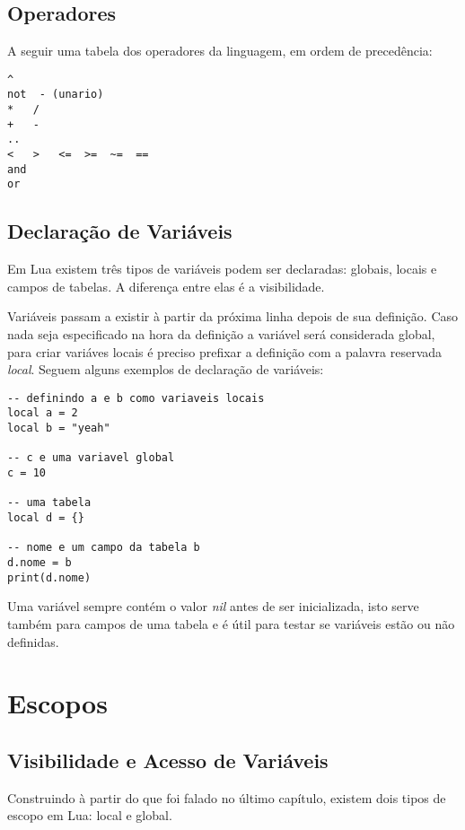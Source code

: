 \documentclass[a4paper,12pt]{abnt}
\begin{document}
\section{Operadores}

A seguir uma tabela dos operadores da linguagem, em ordem de precedência:

\begin{lstlisting}
^
not  - (unario)
*   /
+   -
..
<   >   <=  >=  ~=  ==
and
or
\end{lstlisting}

\section{Declaração de Variáveis}

Em Lua existem três tipos de variáveis podem ser declaradas:
globais, locais e campos de tabelas. A diferença entre
elas é a visibilidade.

Variáveis passam a existir à partir da próxima linha depois de sua definição.
Caso nada seja especificado na hora da definição
a variável será considerada global,
para criar variáves locais é preciso prefixar a definição
com a palavra reservada \emph{local}.
Seguem alguns exemplos de declaração de variáveis:

\begin{lstlisting}
-- definindo a e b como variaveis locais
local a = 2
local b = "yeah"

-- c e uma variavel global
c = 10

-- uma tabela
local d = {}

-- nome e um campo da tabela b
d.nome = b
print(d.nome)
\end{lstlisting}

Uma variável sempre contém o valor \emph{nil} antes de ser inicializada,
isto serve também para campos de uma tabela e é útil para testar
se variáveis estão ou não definidas.

\chapter{Escopos}

\section{Visibilidade e Acesso de Variáveis}

Construindo à partir do que foi falado no último capítulo,
existem dois tipos de escopo em Lua: local e global.
\end{document}
